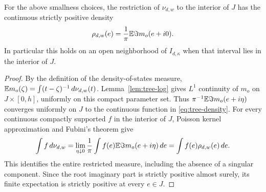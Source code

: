 \begin{corollary}
\label{cor:tree-density}
For the above smallness choices, the restriction of $\nu_{d,w}$ to
the interior of $J$ has the continuous strictly positive density
\begin{equation}\label{eq:tree-density}
 \rho_{d,w}(e)=\frac1\pi\mathbb E\Im m_o(e+i0).
\end{equation}
In particular this holds on an open neighborhood of
$I_{d,\kappa}$ when that interval lies in the interior of $J$.
\end{corollary}

\begin{proof}
By the definition of the density-of-states measure,
$\mathbb E m_o(\zeta)=\int(t-\zeta)^{-1}\,d\nu_{d,w}(t)$.
Lemma~\ref{lem:tree-log} gives $L^1$ continuity of $m_o$ on
$J\times[0,h]$, uniformly on this compact parameter set.  Thus
$\pi^{-1}\mathbb E\Im m_o(e+i\eta)$ converges uniformly on $J$ to
the continuous function in \eqref{eq:tree-density}.  For every
continuous compactly supported $f$ in the interior of $J$, Poisson
kernel approximation and Fubini's theorem give
\[
 \int f\,d\nu_{d,w}
 =\lim_{\eta\downarrow0}\frac1\pi
       \int f(e)\mathbb E\Im m_o(e+i\eta)\,de
 =\int f(e)\rho_{d,w}(e)\,de.
\]
This identifies the entire restricted measure, including the absence
of a singular component.  Since the root imaginary part is strictly
positive almost surely, its finite expectation is strictly positive
at every $e\in J$.
\end{proof}
